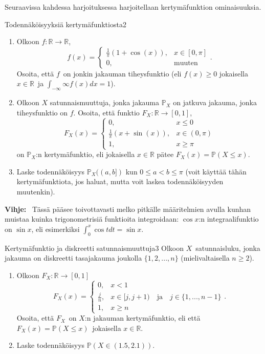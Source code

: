 \documentclass[11pt,a4paper]{amsart}
\newcommand{\R}{\mathbb{R}}
\newcommand{\1}{\mathbf{1}}
\renewcommand{\P}{\mathbb P}
\begin{document}
Seuraavissa kahdessa harjoituksessa harjoitellaan kertymäfunktion ominaisuuksia. 
\begin{Exercises}{Todennäköisyyksiä kertymäfunktiosta}{2}
\begin{enumerate}
\item Olkoon $f:\R\to \R$,
\[
f(x)=\begin{cases}
\frac{1}{\pi}(1+\cos(x)), & x\in [0,\pi]\\
0, & \text{muuten}
\end{cases}.
\]
Osoita, että $f$ on jonkin jakauman tiheysfunktio (eli $f(x)\geq 0$ jokaisella $x\in \R$ ja $\int_{-\infty}\infty f(x)dx=1$).


\item Olkoon $X$ satunnaismuuttuja, jonka jakauma $\P_X$ on jatkuva jakauma, jonka tiheysfunktio on $f$. Osoita, että funktio $F_X:\R\to [0,1]$, 
\[
F_X(x)=\begin{cases}
0, & x\leq 0\\
\frac{1}{\pi}(x+\sin(x)), & x\in (0,\pi)\\
1, & x\geq \pi
\end{cases}
\]
on $\P_X$:n kertymäfunktio, eli jokaisella $x\in \R$ pätee $F_X(x)=\P(X\leq x)$.


\item Laske todennäköisyys $\P_X((a,b])$ kun $0\leq a<b\leq \pi$ (voit käyttää tähän kertymäfunktiota, jos haluat, mutta voit laskea todennäköisyyden muutenkin).
\end{enumerate}
{\bf Vihje: } Tässä pääsee toivottavasti melko pitkälle määritelmien avulla kunhan muistaa kuinka trigonometrisiä funktioita integroidaan: $\cos x$:n integraalifunktio on $\sin x$, eli esimerkiksi $\int_0^x \cos t dt=\sin x$.


\end{Exercises}



\begin{Exercises}{Kertymäfunktio ja diskreetti satunnaismuuttuja}{3}
Olkoon $X$ satunnaisluku, jonka jakauma on diskreetti tasajakauma joukolla $\{1,2,...,n\}$ (mielivaltaisella $n\geq 2$).
\begin{enumerate}
\item Olkoon $F_X:\R\to [0,1]$
\[
F_X(x)=\begin{cases}
0, & x<1\\
\frac{j}{n}, & x\in [j,j+1) \quad \text{ja} \quad j\in \{1,...,n-1\}\\
1, & x\geq n
\end{cases}.
\]
Osoita, että $F_X$ on $X$:n jakauman kertymäfunktio, eli että $F_X(x)=\P(X\leq x)$ jokaisella $x\in \R$. 

\item Laske todennäköisyys $\P(X\in (1.5,2.1))$.

\end{enumerate}
\end{Exercises}
\end{document}
